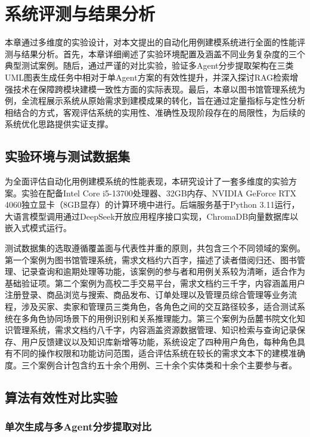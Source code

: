 \chapter{系统评测与结果分析}
\vspace{7pt}

本章通过多维度的实验设计，对本文提出的自动化用例建模系统进行全面的性能评测与结果分析。首先，本章详细阐述了实验环境配置及涵盖不同业务复杂度的三个典型测试案例。随后，通过严谨的对比实验，验证多Agent分步提取架构在三类UML图表生成任务中相对于单Agent方案的有效性提升，并深入探讨RAG检索增强技术在保障跨模块建模一致性方面的实际表现。最后，本章以图书馆管理系统为例，全流程展示系统从原始需求到建模成果的转化，旨在通过定量指标与定性分析相结合的方式，客观评估系统的实用性、准确性及现阶段存在的局限性，为后续的系统优化思路提供实证支撑。

\section{实验环境与测试数据集}

为全面评估自动化用例建模系统的性能表现，本研究设计了一套多维度的实验方案。实验在配备Intel Core i5-13700处理器、32GB内存、NVIDIA GeForce RTX 4060独立显卡（8GB显存）的计算环境中进行。后端服务基于Python 3.11运行，大语言模型调用通过DeepSeek开放应用程序接口实现，ChromaDB向量数据库以嵌入式模式运行。

测试数据集的选取遵循覆盖面与代表性并重的原则，共包含三个不同领域的案例。第一个案例为图书馆管理系统，需求文档约六百字，描述了读者借阅归还、图书管理、记录查询和逾期处理等功能，该案例的参与者和用例关系较为清晰，适合作为基础验证项。第二个案例为高校二手交易平台，需求文档约三千字，内容涵盖用户注册登录、商品浏览与搜索、商品发布、订单处理以及管理员综合管理等业务流程，涉及买家、卖家和管理员三类角色，各角色之间的交互路径较多，适合测试系统在多角色协同场景下的用例识别和关系推理能力。第三个案例为岳麓书院文化知识管理系统，需求文档约八千字，内容涵盖资源数据管理、知识检索与查询记录保存、用户反馈建议以及知识库新增等功能，系统设定了四种用户角色，每种角色具有不同的操作权限和功能访问范围，适合评估系统在较长的需求文本下的建模准确度。三个案例合计包含约五十余个用例、三十余个实体类和十余个主要参与者。

\section{算法有效性对比实验}

\subsection{单次生成与多Agent分步提取对比}

